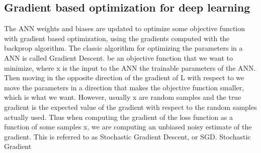 \subsection{Gradient based optimization for deep learning}

The ANN weights and biases are updated to optimize some objective function
with gradient based optimization, using the gradients computed with the backprop algorithm.
The classic algorithm for optimizing the parameters in a ANN is called Gradient
Descent. be an objective function that we want to minimize, where
x is the input to the ANN the trainable parameters of the ANN. Then
moving in the opposite direction of the gradient of L with respect to  we move
the parameters in a direction that makes the objective function smaller, which is
what we want. However, usually x are random samples and the true gradient is
the expected value of the gradient with respect to the random samples actually
used. Thus when computing the gradient of the loss function as a function of
some samples x, we are computing an unbiased noisy estimate of the gradient.
This is referred to as Stochastic Gradient Descent, or SGD. Stochastic Gradient



